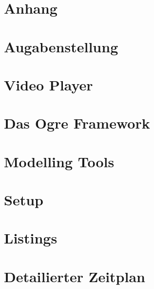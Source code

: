 \section{Anhang}
\appendix
\section{Augabenstellung}
\section{Video Player}
\section{Das Ogre Framework}
\section{Modelling Tools}
\section{Setup}
\section{Listings}
\section{Detailierter Zeitplan}